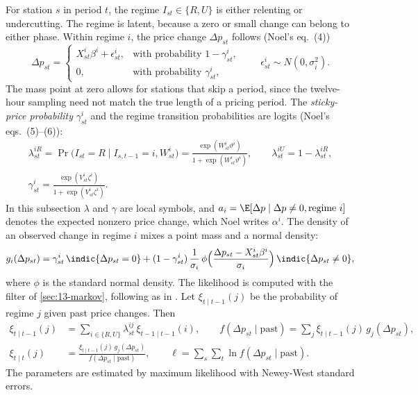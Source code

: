 For station $s$ in period $t$, the regime $I_{st}\in\{R,U\}$ is either relenting or undercutting. The regime is
latent, because a zero or small change can belong to either phase. Within regime $i$, the price change
$\Delta p_{st}$ follows (Noel's eq.~(4))
\begin{equation}\label{eq:13-noel-regime}
\Delta p_{st}=\begin{cases}X^{i}_{st}\beta^{i}+\epsilon^{i}_{st}, & \text{with probability }1-\gamma^{i}_{st},\\
0, & \text{with probability }\gamma^{i}_{st},\end{cases}\qquad \epsilon^{i}_{st}\sim N(0,\sigma_i^2).
\end{equation}
The mass point at zero allows for stations that skip a period, since the twelve-hour sampling need not match the
true length of a pricing period. The \emph{sticky-price probability} $\gamma^i_{st}$ and the regime transition
probabilities are logits (Noel's eqs.~(5)--(6)):
\begin{equation}\label{eq:13-noel-logits}
\begin{gathered}
\lambda^{iR}_{st}=\Pr\big(I_{st}=R\mid I_{s,t-1}=i,W^i_{st}\big)=\frac{\exp(W^i_{st}\vartheta^i)}{1+\exp(W^i_{st}\vartheta^i)},\qquad
\lambda^{iU}_{st}=1-\lambda^{iR}_{st},\\
\gamma^i_{st}=\frac{\exp(V^i_{st}\zeta^i)}{1+\exp(V^i_{st}\zeta^i)} .
\end{gathered}
\end{equation}
In this subsection $\lambda$ and $\gamma$ are local symbols, and $a_i=\E[\Delta p\mid\Delta p\neq0,\text{regime }i]$
denotes the expected nonzero price change, which Noel writes $\alpha^i$. The density of an observed change in
regime $i$ mixes a point mass and a normal density:
\begin{equation}\label{eq:13-noel-density}
g_i(\Delta p_{st})=\gamma^i_{st}\,\indic\{\Delta p_{st}=0\}+(1-\gamma^i_{st})\,\frac{1}{\sigma_i}\,\phi\Big(\frac{\Delta p_{st}-X^i_{st}\beta^i}{\sigma_i}\Big)\,\indic\{\Delta p_{st}\neq0\},
\end{equation}
where $\phi$ is the standard normal density.
The likelihood is computed with the filter of \cref{sec:13-markov}, following \citet{CosslettLee1985} as in
\citet{Ellison1994}. Let $\xi_{t\mid t-1}(j)$ be the probability of regime $j$ given past price changes. Then
\begin{align*}
\xi_{t\mid t-1}(j)&=\sum_{i\in\{R,U\}}\lambda^{ij}_{st}\,\xi_{t-1\mid t-1}(i),\qquad
f(\Delta p_{st}\mid\text{past})=\sum_{j}\xi_{t\mid t-1}(j)\,g_j(\Delta p_{st}),\\
\xi_{t\mid t}(j)&=\frac{\xi_{t\mid t-1}(j)\,g_j(\Delta p_{st})}{f(\Delta p_{st}\mid\text{past})},\qquad
\ell=\sum_{s}\sum_{t}\ln f(\Delta p_{st}\mid\text{past}).
\end{align*}
The parameters are estimated by maximum likelihood with Newey-West standard errors.

